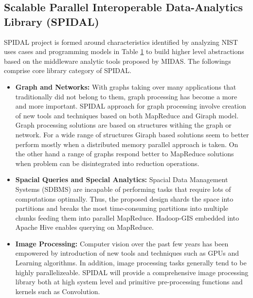 \documentclass[runningheads,a4paper]{llncs}
\begin{document}
{\begin{table}
\begin{tabular}{ |p{4cm}|p{7cm}|  }
	\end{tabular}
	\label{table:NIST_5_Programming_model}
\end{table}

\subsection*{Scalable Parallel Interoperable Data-Analytics Library (SPIDAL) }
SPIDAL project is formed around characteristics identified by analyzing NIST uses cases and programming models in Table \ref{table:NIST_5_Programming_model} to build higher level abstractions based on the middleware analytic tools proposed by MIDAS. The followings comprise  core library category of SPIDAL.
\begin{itemize}
	\item \textbf{Graph and Networks:} With graphs taking over many applications that traditionally did not belong to them, graph processing has become a more and more important. SPIDAL approach for graph processing involve creation of new tools and techniques based on both MapReduce and Giraph \cite{avery2011giraph} model. Graph processing solutions are based on structures withing the graph or network. For a wide range of structures Giraph based solutions seem to better perform mostly when a distributed memory parallel approach is taken. On the other hand a range of graphs respond better to MapReduce solutions when problem can be disintegrated into reduction operations.\\
	\item \textbf{Spacial Queries and Special Analytics:} Spacial Data Management Systems (SDBMS) are incapable of performing tasks that require lots of computations optimally. Thus, the proposed design shards the space into partitions and breaks the most time-consuming partitions into multiple chunks feeding them into parallel MapReduce. Hadoop-GIS \cite{aji2013hadoop} embedded into Apache Hive enables querying on MapReduce.\\
	
	\item \textbf{Image Processing:} Computer vision over the past few years has been empowered by introduction of new tools and techniques such as GPUs and Learning algorithms. In addition, image processing tasks generally tend to be highly parallelizeable. SPIDAL will provide a comprehensive image processing library both at high system level and primitive pre-processing functions and kernels such as Convolution.\\
	 

\end{itemize}}
\end{document}

